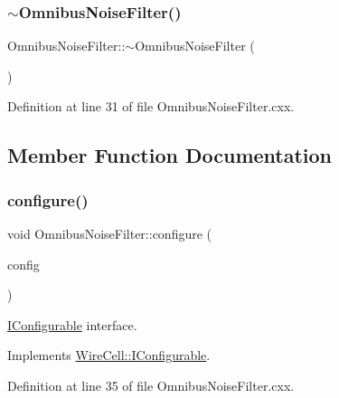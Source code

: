 \subsubsection{\texorpdfstring{$\sim$\+Omnibus\+Noise\+Filter()}{~OmnibusNoiseFilter()}}
{\footnotesize\ttfamily Omnibus\+Noise\+Filter\+::$\sim$\+Omnibus\+Noise\+Filter (\begin{DoxyParamCaption}{ }\end{DoxyParamCaption})\hspace{0.3cm}{\ttfamily [virtual]}}



Definition at line 31 of file Omnibus\+Noise\+Filter.\+cxx.



\subsection{Member Function Documentation}
\mbox{\label{class_wire_cell_1_1_sig_proc_1_1_omnibus_noise_filter_ab0cec8bc8e82f741f33cc663dc9eddc5}} 
\subsubsection{\texorpdfstring{configure()}{configure()}}
{\footnotesize\ttfamily void Omnibus\+Noise\+Filter\+::configure (\begin{DoxyParamCaption}\item[{const \hyperlink{namespace_wire_cell_a9f705541fc1d46c608b3d32c182333ee}{Wire\+Cell\+::\+Configuration} \&}]{config }\end{DoxyParamCaption})\hspace{0.3cm}{\ttfamily [virtual]}}



\hyperlink{class_wire_cell_1_1_i_configurable}{I\+Configurable} interface. 



Implements \hyperlink{class_wire_cell_1_1_i_configurable_a57ff687923a724093df3de59c6ff237d}{Wire\+Cell\+::\+I\+Configurable}.



Definition at line 35 of file Omnibus\+Noise\+Filter.\+cxx.

